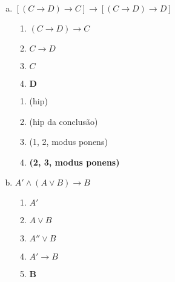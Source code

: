 \begin{Gabarito}{11}
\begin{enumerate}[a)]
\begin{multicols}{2}
        \columnbreak

        \begin{enumerate}[\ding{32}]
          \item (hip)
          \item (hip)
          \item (hip da conclusão)
          \item (1, 3, modus ponens)
          \item (2, 3, modus ponens)
          \item \textbf{(4, 5, modus ponens)}
        \end{enumerate}

      \end{multicols}

      \item $[(C \rightarrow D) \rightarrow C] \rightarrow [(C \rightarrow D) \rightarrow D]$ \\
      \begin{multicols}{2}

        \begin{enumerate}[1.]
          \item $(C \rightarrow D) \rightarrow C$
          \item $C \rightarrow D$
          \item $C$
          \item $\boldsymbol{D}$
        \end{enumerate}

        \columnbreak

        \begin{enumerate}[\ding{32}]
          \item (hip)
          \item (hip da conclusão)
          \item (1, 2, modus ponens)
          \item \textbf{(2, 3, modus ponens)}
        \end{enumerate}

      \end{multicols}

      \item $A' \wedge (A \vee B) \rightarrow B$ \\
      \begin{multicols}{2}

        \begin{enumerate}[1.]
          \item $A'$
          \item $A \vee B$
          \item $A'' \vee B$
          \item $A' \rightarrow B$
          \item $\boldsymbol{B}$
        \end{enumerate}


\end{multicols}
\end{enumerate}
\end{Gabarito}
